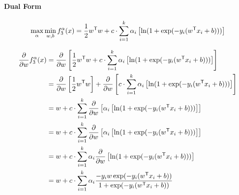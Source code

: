 \documentclass[15pt,landscape]{article}
\newcommand{\tr}{^\mathsf{T}}
\begin{document}
\paragraph{Dual Form}
\begin{align*}
\max\limits_{\alpha} \min\limits_{w,b} f^{\alpha}_3(x) = \frac{1}{2} w\tr w +c \cdot \sum\limits_{i=1}^k \alpha_i \left[ \ln(\zLog)\right]\\
\end{align*}

\begin{align*}
\frac{\partial}{\partial w} f^{\alpha}_3(x) &= \frac{\partial}{\partial w} \left[  \frac{1}{2} w\tr w +c \cdot \sum\limits_{i=1}^k \alpha_i \left[ \ln(\zLog)\right] \right]\\
&= \frac{\partial}{\partial w} \left[  \frac{1}{2} w\tr w \right] + \frac{\partial}{\partial w} \left[  c \cdot \sum\limits_{i=1}^k \alpha_i \left[\ln(\zLog)\right] \right]\\
&=  w  +  c \cdot \sum\limits_{i=1}^k \frac{\partial}{\partial w} \left[  \alpha_i \left[\ln(\zLog)\right] \right]\\
&=  w  +  c \cdot \sum\limits_{i=1}^k \frac{\partial}{\partial w} \left[  \alpha_i \left[\ln(\zLog)\right] \right]\\
&=  w  +  c \cdot \sum\limits_{i=1}^k \alpha_i  \frac{\partial}{\partial w}  \left[\ln(\zLog)\right] \\
&=  w  +  c \cdot \sum\limits_{i=1}^k \alpha_i  \frac{ -y_i w\exp(-y_i(w\tr x_i + b)) }{\zLog}\\
\end{align*}


\end{document}
